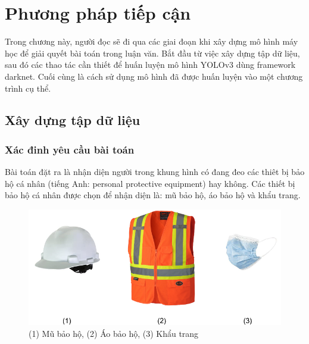 \chapter{Phương pháp tiếp cận}
Trong chương này, người đọc sẽ đi qua các giai đoạn khi xây dựng mô hình máy học để giải quyết bài toán trong luận văn. Bắt đầu từ việc xây dựng tập dữ liệu, sau đó các thao tác cần thiết để huấn luyện mô hình YOLOv3 dùng framework darknet. Cuối cùng là cách sử dụng mô hình đã được huấn luyện vào một chương trình cụ thể.
\section{Xây dựng tập dữ liệu}
\subsection{Xác đinh yêu cầu bài toán}
Bài toán đặt ra là nhận diện người trong khung hình có đang đeo các thiêt bị bảo hộ cá nhân (tiếng Anh: personal protective equipment) hay không. Các thiết bị bảo hộ cá nhân được chọn để nhận diện là: mũ bảo hộ, áo bảo hộ và khẩu trang.
\begin{figure}[ht!]
	\centerline{\includegraphics[scale=0.3]{images/ppe.png}}
  	\caption{(1) Mũ bảo hộ, (2) Áo bảo hộ, (3) Khẩu trang}
  	\label{fig:ppe}
\end{figure}


